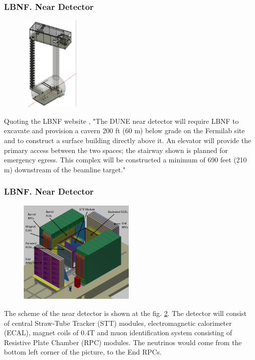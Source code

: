 \begin{frame}\frametitle{LBNF. Near Detector}
\scriptsize
\begin{figure}
\label{fig:nearDetector}
\centering
\includegraphics[width=0.25\textwidth, keepaspectratio=true]{figs/nearDetector_project.png}
\end{figure}
\scriptsize
Quoting the LBNF website \cite{ref_LBNFweb}, "The DUNE near detector will require LBNF to excavate and provision a cavern 200 ft (60 m) below grade on the Fermilab site and to construct a surface building directly above it. An elevator will provide the primary access between the two spaces; the stairway shown is planned for emergency egress. This complex will be constructed a minimum of 690 feet (210 m) downstream of the beamline target."
\end{frame}

\begin{frame}\frametitle{LBNF. Near Detector}
\scriptsize
\begin{figure}
\label{fig:nearDetector}
\centering
\includegraphics[width=0.50\textwidth, keepaspectratio=true]{figs/nearDetector.png}
\end{figure}
\scriptsize
The scheme of the near detector is shown at the fig. \ref{fig:nearDetector}. The detector will consist of central Straw-Tube Tracker (STT) modules, electromagnetic calorimeter (ECAL), magnet coils of 0.4T and muon identification system consisting of Resistive Plate Chamber (RPC) modules. The neutrinos would come from the bottom left corner of the picture, to the End RPCs.\\
\end{frame}

